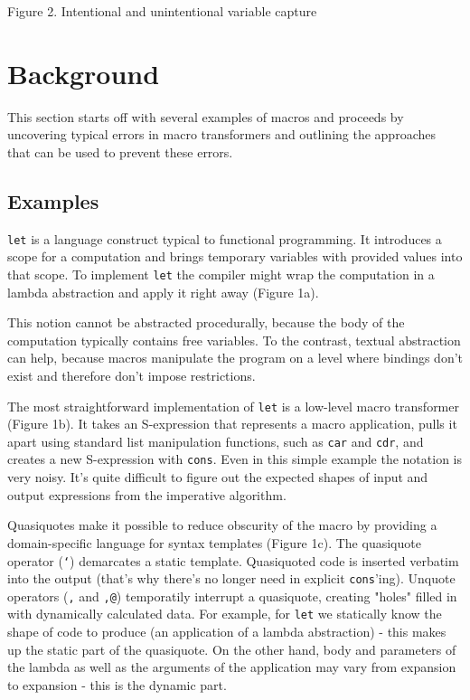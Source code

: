 \documentclass[10pt,journal,a4paper]{IEEEtran}
\begin{document}
\begin{figure*}
\hskip5.05cm
\normalsize Figure 2. Intentional and unintentional variable capture
\end{figure*}

\section{Background}

This section starts off with several examples of macros
and proceeds by uncovering typical errors in macro transformers
and outlining the approaches that can be used to prevent these errors.

\subsection{Examples}

\small \texttt{let} \normalsize is a language construct typical to functional programming. It introduces
a scope for a computation and brings temporary variables with provided values into that scope.
To implement \small \texttt{let} \normalsize the compiler might wrap the computation in a lambda abstraction
and apply it right away (Figure 1a).

This notion cannot be abstracted procedurally, because the body of the computation typically
contains free variables. To the contrast, textual abstraction can help, because macros manipulate
the program on a level where bindings don't exist and therefore don't impose restrictions.

The most straightforward implementation of \small \texttt{let} \normalsize
is a low-level macro transformer (Figure 1b).
It takes an S-expression that represents a macro application, pulls it apart using standard
list manipulation functions, such as \small \texttt{car} and \small \texttt{cdr}\normalsize,
and creates a new S-expression with \small \texttt{cons}\normalsize.
Even in this simple example the notation is very noisy. It's quite difficult
to figure out the expected shapes of input and output expressions from the imperative algorithm.

Quasiquotes \cite{bawden99} make it possible to reduce obscurity of the macro by providing
a domain-specific language for syntax templates (Figure 1c). The quasiquote operator (\texttt{`})
demarcates a static template. Quasiquoted code is inserted verbatim into the output
(that's why there's no longer need in explicit \small \texttt{cons}\normalsize'ing).
Unquote operators (\texttt{,} and \texttt{,@})
temporatily interrupt a quasiquote, creating "holes" filled in with dynamically calculated
data. For example, for \small \texttt{let} \normalsize we statically know the shape of code to produce
(an application of a lambda abstraction) - this makes up the static part of the quasiquote. On the other hand,
body and parameters of the lambda as well as the arguments of the application may vary from
expansion to expansion - this is the dynamic part.
\end{document}
